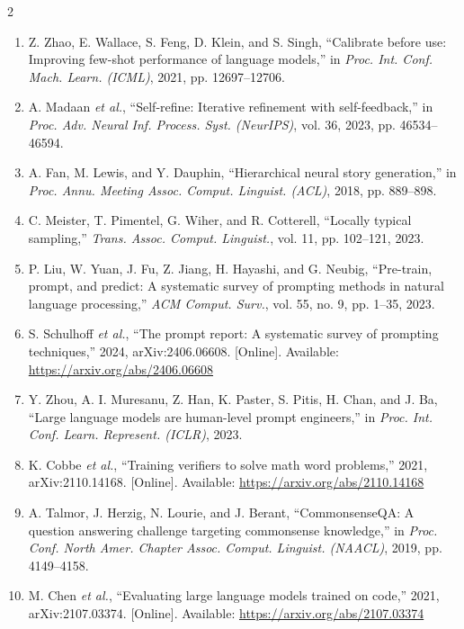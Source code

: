 \documentclass{article}
\begin{document}
\begin{multicols}{2}
\begin{enumerate}
\item[] [11] Z. Zhao, E. Wallace, S. Feng, D. Klein, and S. Singh, ``Calibrate before use: Improving few-shot performance of language models,'' in \textit{Proc. Int. Conf. Mach. Learn. (ICML)}, 2021, pp. 12697--12706.
\item[] [12] A. Madaan \textit{et al.}, ``Self-refine: Iterative refinement with self-feedback,'' in \textit{Proc. Adv. Neural Inf. Process. Syst. (NeurIPS)}, vol. 36, 2023, pp. 46534--46594.
\item[] [13] A. Fan, M. Lewis, and Y. Dauphin, ``Hierarchical neural story generation,'' in \textit{Proc. Annu. Meeting Assoc. Comput. Linguist. (ACL)}, 2018, pp. 889--898.
\item[] [14] C. Meister, T. Pimentel, G. Wiher, and R. Cotterell, ``Locally typical sampling,'' \textit{Trans. Assoc. Comput. Linguist.}, vol. 11, pp. 102--121, 2023.
\item[] [15] P. Liu, W. Yuan, J. Fu, Z. Jiang, H. Hayashi, and G. Neubig, ``Pre-train, prompt, and predict: A systematic survey of prompting methods in natural language processing,'' \textit{ACM Comput. Surv.}, vol. 55, no. 9, pp. 1--35, 2023.
\item[] [16] S. Schulhoff \textit{et al.}, ``The prompt report: A systematic survey of prompting techniques,'' 2024, arXiv:2406.06608. [Online]. Available: \url{https://arxiv.org/abs/2406.06608}
\item[] [17] Y. Zhou, A. I. Muresanu, Z. Han, K. Paster, S. Pitis, H. Chan, and J. Ba, ``Large language models are human-level prompt engineers,'' in \textit{Proc. Int. Conf. Learn. Represent. (ICLR)}, 2023.
\item[] [18] K. Cobbe \textit{et al.}, ``Training verifiers to solve math word problems,'' 2021, arXiv:2110.14168. [Online]. Available: \url{https://arxiv.org/abs/2110.14168}
\item[] [19] A. Talmor, J. Herzig, N. Lourie, and J. Berant, ``CommonsenseQA: A question answering challenge targeting commonsense knowledge,'' in \textit{Proc. Conf. North Amer. Chapter Assoc. Comput. Linguist. (NAACL)}, 2019, pp. 4149--4158.
\item[] [20] M. Chen \textit{et al.}, ``Evaluating large language models trained on code,'' 2021, arXiv:2107.03374. [Online]. Available: \url{https://arxiv.org/abs/2107.03374}
\end{enumerate}

\end{multicols}
\end{document}

